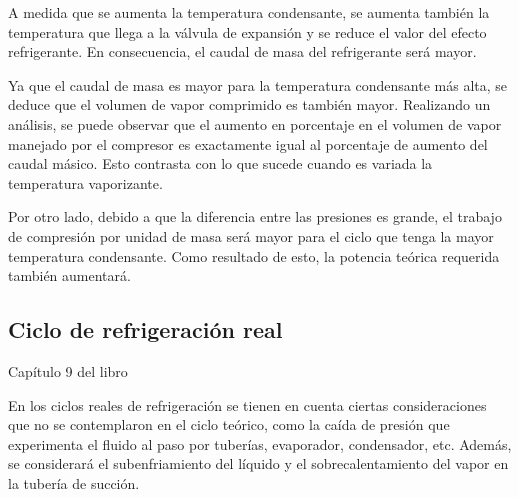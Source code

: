 		A medida que se aumenta la temperatura condensante, se aumenta también la temperatura que llega a la válvula de expansión y se reduce el valor del efecto refrigerante. En consecuencia, el caudal de masa del refrigerante será mayor.
		
		
		Ya que el caudal de masa es mayor para la temperatura condensante más alta, se deduce que el volumen de vapor comprimido es también mayor. Realizando un análisis, se puede observar que el aumento en porcentaje en el volumen de vapor manejado por el compresor es exactamente igual al porcentaje de aumento del caudal másico. Esto contrasta con lo que sucede cuando es variada la temperatura vaporizante.
		
		Por otro lado, debido a que la diferencia entre las presiones es grande, el trabajo de compresión por unidad de masa será mayor para el ciclo que tenga la mayor temperatura condensante. Como resultado de esto, la potencia teórica requerida también aumentará.
		
		
	\subsection{Ciclo de refrigeración real}
	
	Capítulo 9 del libro
	
		En los ciclos reales de refrigeración se tienen en cuenta ciertas consideraciones que no se contemplaron en el ciclo teórico, como la caída de presión que experimenta el fluido al paso por tuberías, evaporador, condensador, etc. Además, se considerará el subenfriamiento del líquido y el sobrecalentamiento del vapor en la tubería de succión.
		
